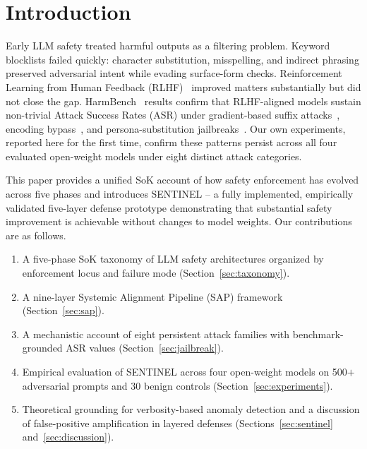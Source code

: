 \documentclass[conference]{IEEEtran}
\begin{document}
\section{Introduction}
\label{sec:intro}

Early LLM safety treated harmful outputs as a filtering problem.
Keyword blocklists failed quickly: character substitution, misspelling, and
indirect phrasing preserved adversarial intent while evading surface-form
checks.
Reinforcement Learning from Human Feedback
(RLHF)~\cite{ouyang2022training,christiano2017deep} improved matters
substantially but did not close the gap.
HarmBench~\cite{mazeika2024harmbench} results confirm that RLHF-aligned models
sustain non-trivial Attack Success Rates (ASR) under gradient-based suffix
attacks~\cite{zou2023universal}, encoding bypass~\cite{chu2024comprehensive},
and persona-substitution
jailbreaks~\cite{wei2023jailbroken}.
Our own experiments, reported here for the first time, confirm these patterns
persist across all four evaluated open-weight models under eight distinct attack
categories.

This paper provides a unified SoK account of how safety enforcement has
evolved across five phases and introduces SENTINEL -- a fully implemented,
empirically validated five-layer defense prototype demonstrating that
substantial safety improvement is achievable without changes to model weights.
Our contributions are as follows.
\begin{enumerate}[leftmargin=1.4em,itemsep=1pt]
  \item A five-phase SoK taxonomy of LLM safety architectures organized by
    enforcement locus and failure mode (Section~\ref{sec:taxonomy}).
  \item A nine-layer Systemic Alignment Pipeline (SAP) framework
    (Section~\ref{sec:sap}).
  \item A mechanistic account of eight persistent attack families with
    benchmark-grounded ASR values (Section~\ref{sec:jailbreak}).
  \item Empirical evaluation of SENTINEL across four open-weight models on
    500$+$ adversarial prompts and 30 benign controls
    (Section~\ref{sec:experiments}).
  \item Theoretical grounding for verbosity-based anomaly detection and
    a discussion of false-positive amplification in layered defenses
    (Sections~\ref{sec:sentinel} and~\ref{sec:discussion}).
\end{enumerate}
\end{document}
